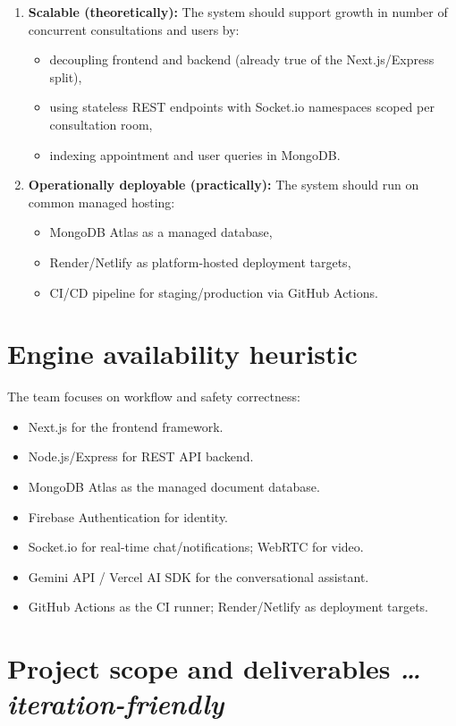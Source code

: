 \documentclass[11pt,a4paper]{article}
\newcommand{\BvrHint}[1]{%
{\normalfont\normalsize\itshape\hfill #1}}
\begin{document}
\begin{enumerate}[leftmargin=0.7cm]
\item \textbf{Scalable (theoretically):} The system should support growth in number of concurrent consultations and users by:
\begin{itemize}[leftmargin=0.7cm]
\item decoupling frontend and backend (already true of the Next.js/Express split),
\item using stateless REST endpoints with Socket.io namespaces scoped per consultation room,
\item indexing appointment and user queries in MongoDB.
\end{itemize}

\item \textbf{Operationally deployable (practically):} The system should run on common managed hosting:  
\begin{itemize}[leftmargin=0.7cm]  
    \item MongoDB Atlas as a managed database,  
    \item Render/Netlify as platform-hosted deployment targets,  
    \item CI/CD pipeline for staging/production via GitHub Actions.  
\end{itemize}

\end{enumerate}

\section{Engine availability heuristic}
The team focuses on workflow and safety
correctness:
\begin{itemize}[leftmargin=0.7cm]
\item Next.js for the frontend framework.
\item Node.js/Express for REST API backend.
\item MongoDB Atlas as the managed document database.
\item Firebase Authentication for identity.
\item Socket.io for real-time chat/notifications; WebRTC for video.
\item Gemini API / Vercel AI SDK for the conversational assistant.
\item GitHub Actions as the CI runner; Render/Netlify as deployment targets.
\end{itemize}

\section{Project scope and deliverables %
\BvrHint{\ldots iteration-friendly}}
\end{document}
